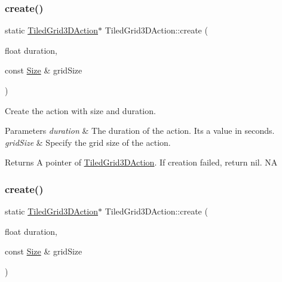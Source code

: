 \mbox{\label{classTiledGrid3DAction_a25c94bed88c9770550409009b911d0d7}} 
\subsubsection{\texorpdfstring{create()}{create()}\hspace{0.1cm}{\footnotesize\ttfamily [1/2]}}
{\footnotesize\ttfamily static \hyperlink{classTiledGrid3DAction}{Tiled\+Grid3\+D\+Action}$\ast$ Tiled\+Grid3\+D\+Action\+::create (\begin{DoxyParamCaption}\item[{float}]{duration,  }\item[{const \hyperlink{classSize}{Size} \&}]{grid\+Size }\end{DoxyParamCaption})\hspace{0.3cm}{\ttfamily [static]}}



Create the action with size and duration. 


\begin{DoxyParams}{Parameters}
{\em duration} & The duration of the action. It\textquotesingle{}s a value in seconds. \\
\hline
{\em grid\+Size} & Specify the grid size of the action. \\
\hline
\end{DoxyParams}
\begin{DoxyReturn}{Returns}
A pointer of \hyperlink{classTiledGrid3DAction}{Tiled\+Grid3\+D\+Action}. If creation failed, return nil.  NA 
\end{DoxyReturn}
\mbox{\label{classTiledGrid3DAction_a25c94bed88c9770550409009b911d0d7}} 
\subsubsection{\texorpdfstring{create()}{create()}\hspace{0.1cm}{\footnotesize\ttfamily [2/2]}}
{\footnotesize\ttfamily static \hyperlink{classTiledGrid3DAction}{Tiled\+Grid3\+D\+Action}$\ast$ Tiled\+Grid3\+D\+Action\+::create (\begin{DoxyParamCaption}\item[{float}]{duration,  }\item[{const \hyperlink{classSize}{Size} \&}]{grid\+Size }\end{DoxyParamCaption})\hspace{0.3cm}{\ttfamily [static]}}



